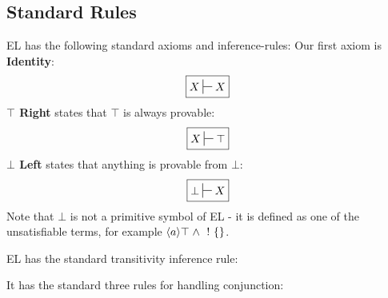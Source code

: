 \subsection{Standard Rules}
EL has the following standard axioms and inference-rules:
Our first axiom is {\bf Identity}:
\[
\boxed
{
X \judge X
}
\]
{\bf $\top$ Right} states that $\top$ is always provable:
\[
\boxed
{
X \judge \top
}
\]
{\bf $\bot$ Left} states that anything is provable from $\bot$:
\[
\boxed
{
\bot \judge X
}
\]
Note that $\bot$ is not a primitive symbol of EL - it is defined as one of the unsatisfiable terms, for example $\langle a \rangle \top \; \land \; \ ! \  \{\}$. 

EL has the standard transitivity inference rule:
\begin{center}
\end{center}
It has the standard three rules for handling conjunction:
\begin{center}
\end{center}

\begin{center}
\end{center}

\begin{center}
\end{center}

